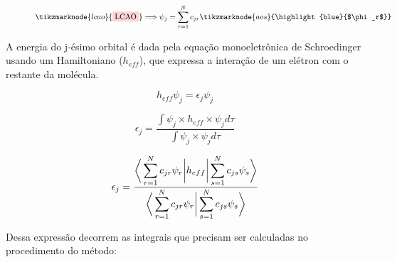 \begin{figure}[htb]
    \vspace{2\baselineskip}
\begin{equation}
    \label{eq:LCAO}
    \tikzmarknode{lcao}{\highlight{red}{LCAO}} \Longrightarrow \psi_j = \sum_{r=1}^{N} c_{jr} \tikzmarknode{aos}{\highlight{blue}{$\phi_r$}}
\end{equation}
\vspace{2\baselineskip}
\end{figure}

A energia do j-ésimo orbital é dada pela equação monoeletrônica de Schroedinger usando um Hamiltoniano ($h_{eff}$), que expressa a interação de um elétron com o restante da molécula.

\begin{equation}
    h_{eff} \psi_j = \epsilon_j \psi_j
\end{equation}

\begin{equation}
    \epsilon_j = \frac{ \displaystyle \int \psi_j  \times h_{eff} \times \psi_j d\tau}{\displaystyle \int \psi_j \times \psi_j d\tau}
\end{equation}

\begin{equation}
    \epsilon_j = \frac{ \displaystyle \bigg{\langle} \sum_{r=1}^{N} c_{jr} \psi_r \bigg{|} h_{eff} \bigg{|} \sum_{s=1}^{N} c_{js} \psi_s \bigg{\rangle}}{\displaystyle \bigg{\langle} \sum_{r=1}^{N} c_{jr} \psi_r \bigg{|} \sum_{s=1}^{N} c_{js} \psi_s \bigg{\rangle}}
\end{equation}

Dessa expressão decorrem as integrais que precisam ser calculadas no procedimento do método:

